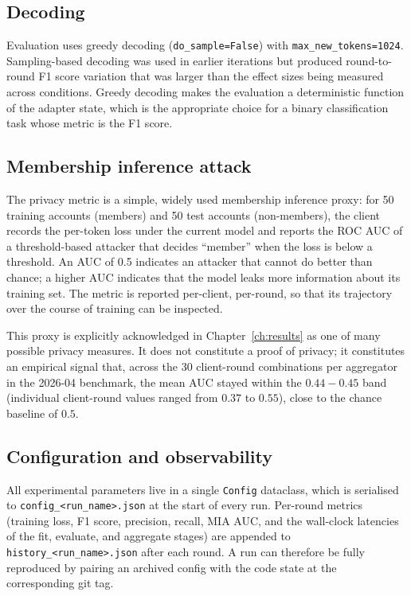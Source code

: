 \documentclass{report}
\begin{document}
\subsection{Decoding}

Evaluation uses greedy decoding (\texttt{do\_sample=False}) with \texttt{max\_new\_tokens=1024}. Sampling-based decoding was used in earlier iterations but produced round-to-round F1 score variation that was larger than the effect sizes being measured across conditions. Greedy decoding makes the evaluation a deterministic function of the adapter state, which is the appropriate choice for a binary classification task whose metric is the F1 score.

\subsection{Membership inference attack}
\label{sec:meth:impl:mia}

The privacy metric is a simple, widely used membership inference proxy: for 50 training accounts (members) and 50 test accounts (non-members), the client records the per-token loss under the current model and reports the ROC AUC of a threshold-based attacker that decides \enquote{member} when the loss is below a threshold. An AUC of 0.5 indicates an attacker that cannot do better than chance; a higher AUC indicates that the model leaks more information about its training set. The metric is reported per-client, per-round, so that its trajectory over the course of training can be inspected.

This proxy is explicitly acknowledged in Chapter~\ref{ch:results} as one of many possible privacy measures. It does not constitute a proof of privacy; it constitutes an empirical signal that, across the 30 client-round combinations per aggregator in the 2026-04 benchmark, the mean AUC stayed within the $0.44{-}0.45$ band (individual client-round values ranged from $0.37$ to $0.55$), close to the chance baseline of $0.5$.

\subsection{Configuration and observability}

All experimental parameters live in a single \texttt{Config} dataclass, which is serialised to \texttt{config\_<run\_name>.json} at the start of every run. Per-round metrics (training loss, F1 score, precision, recall, MIA AUC, and the wall-clock latencies of the fit, evaluate, and aggregate stages) are appended to \texttt{history\_<run\_name>.json} after each round. A run can therefore be fully reproduced by pairing an archived config with the code state at the corresponding git tag.
\end{document}
